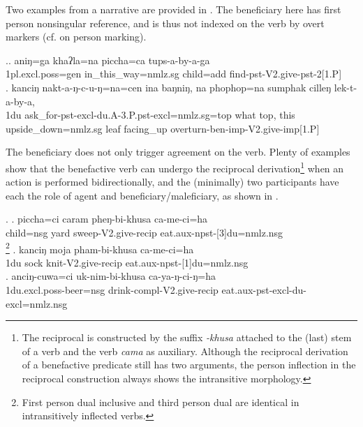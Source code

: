 Two examples from a narrative are provided in \Next. The beneficiary here has first person nonsingular reference, and is thus not indexed on the verb by overt markers (cf.  on person marking).

\ex.\ag. aniŋ=ga          khaʔla=na   piccha=ca    tups-a-by-a-ga\\
	{\sc 1pl.excl.poss=gen} in\_this\_way{\sc =nmlz.sg} child{\sc =add} find{\sc -pst-V2.give-pst-2[1.P]}\\
 
\bg. kanciŋ nakt-a-ŋ-c-u-ŋ=na=cen ina baŋniŋ, na phophop=na sumphak cilleŋ  lek-t-a-by-a,\\
 {\sc 1du} ask\_for{\sc -pst-excl-du.A-3.P.pst-excl=nmlz.sg=top} what  {\sc top}, this upside\_down{\sc =nmlz.sg} leaf    facing\_up overturn{\sc -ben-imp-V2.give-imp[1.P]}\\


The beneficiary does not only trigger agreement on the verb. Plenty of examples show that the benefactive verb can undergo the reciprocal derivation\footnote{The reciprocal is constructed by the suffix \emph{-khusa} attached to the (last) stem of a verb and the verb \emph{cama}  as auxiliary. Although the  reciprocal derivation of a benefactive predicate still has two arguments, the person inflection in the reciprocal construction always shows the intransitive morphology.} when an action is performed bidirectionally, and the (minimally) two participants have each the role of agent and beneficiary/maleficiary, as shown in \Next.  

\ex. \ag. piccha=ci caram pheŋ-bi-khusa ca-me-ci=ha\\
 child{\sc =nsg} yard sweep-{\sc V2.give-recip} eat{\sc .aux-npst-[3]du=nmlz.nsg}\\
\footnote{First person dual inclusive and third person dual are  identical in intransitively inflected verbs.}
\bg. kanciŋ moja pham-bi-khusa ca-me-ci=ha\\
 {\sc 1du} sock knit-{\sc V2.give-recip} eat{\sc .aux-npst-[1]du=nmlz.nsg}\\
 \bg. anciŋ-cuwa=ci uk-nim-bi-khusa ca-ya-ŋ-ci-ŋ=ha\\
 {\sc 1du.excl.poss}-beer{\sc =nsg} drink-{\sc compl-V2.give-recip} eat{\sc .aux-pst-excl-du-excl=nmlz.nsg}\\
 
